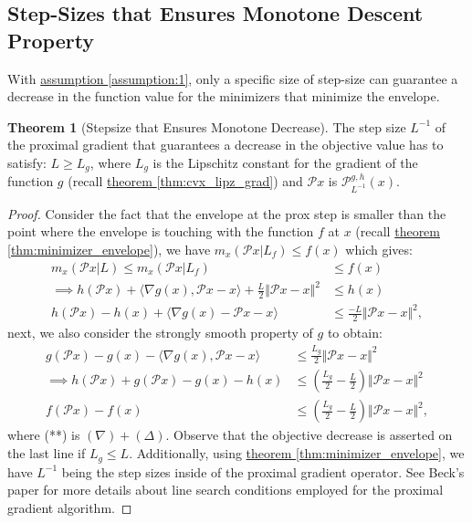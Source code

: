 \documentclass[]{article}
\theoremstyle{definition}
\newtheorem{theorem}{Theorem}       %
\begin{document}
    \subsection{Step-Sizes that Ensures Monotone Descent Property}
        With \hyperref[assumption:1]{assumption \ref*{assumption:1}}, only a specific size of step-size can guarantee a decrease in the function value for the minimizers that minimize the envelope. 
        \begin{theorem}[Stepsize that Ensures Monotone Decrease]\label{thm:monotone_decrease}
            The step size $L^{-1}$ of the proximal gradient that guarantees a decrease in the objective value has to satisfy: $L \ge L_g$, where $L_g$ is the Lipschitz constant for the gradient of the function $g$ (recall \hyperref[thm:cvx_lipz_grad]{theorem \ref*{thm:cvx_lipz_grad}}) and $\mathcal Px$ is $\mathcal P_{L^{-1}}^{g, h}(x)$. 
        \end{theorem}
        \begin{proof}Consider the fact that the envelope at the prox step is smaller than the point where the envelope is touching with the function $f$ at $x$ (recall \hyperref[thm:minimizer_envelope]{theorem \ref*{thm:minimizer_envelope}}), we have $m_x(\mathcal Px|L_f)\le f(x)$ which gives: 
            \begin{align*}
                m_x(\mathcal Px|L) \le m_x(\mathcal Px|L_f) 
                &\le f(x)
                \\
                \implies h(\mathcal Px)+ 
                \langle \nabla g(x), \mathcal P x - x\rangle + \frac{L}{2}\Vert \mathcal Px - x\Vert^2 
                &\le h(x)
                \\
                h(\mathcal Px) - h(x) + \langle \nabla g(x) - \mathcal Px - x\rangle 
                &\le \frac{-L}{2} \Vert \mathcal Px - x\Vert^2, \tag{$\Delta$}
            \end{align*}
            next, we also consider the strongly smooth property of $g$ to obtain: 
            \begin{align*}
                g(\mathcal Px) - g(x) - \langle \nabla g(x), \mathcal Px - x\rangle 
                & \le \frac{L_g}{2}\Vert \mathcal Px - x\Vert^2 \tag{$\nabla$}
                \\
                \implies
                h(\mathcal Px) + g(\mathcal Px) - g(x) - h(x)
                &\le 
                \left(
                    \frac{L_g}{2} - \frac{L}{2}
                \right)\Vert \mathcal Px - x\Vert^2 \tag{**}
                \\
                f(\mathcal Px) - f(x) 
                &\le
                \left(
                    \frac{L_g}{2} - \frac{L}{2}
                \right)\Vert \mathcal Px - x\Vert^2, 
            \end{align*}
            where (**) is $(\nabla) + (\Delta)$. Observe that the objective decrease is asserted on the last line if $L_g \le L$. Additionally, using \hyperref[thm:minimizer_envelope]{theorem \ref*{thm:minimizer_envelope}}, we have $L^{-1}$ being the step sizes inside of the proximal gradient operator. See Beck's paper \cite{paper:FISTA} for more details about line search conditions employed for the proximal gradient algorithm.
        \end{proof}
\end{document}
